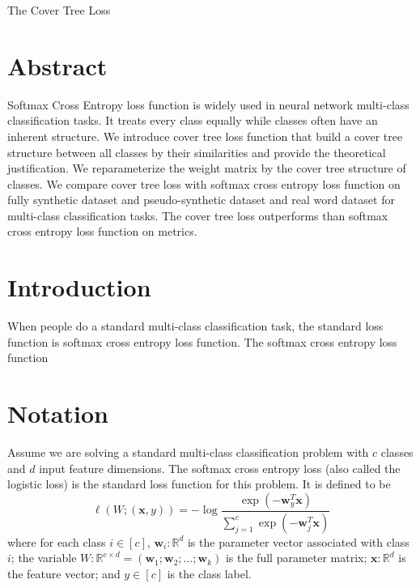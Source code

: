 \documentclass[10pt]{article}
\theoremstyle{definition}
\newcommand{\R}{\mathbb R}
\newcommand{\trans}[1]{{#1}^{T}}
\newcommand{\w}{\mathbf w}
\newcommand{\x}{\mathbf x}
\begin{document}
\begin{center}
\Huge
The Cover Tree Loss
\end{center}

\section{Abstract}
Softmax Cross Entropy loss function is widely used in neural network multi-class classification tasks. 
It treats every class equally while classes often have an inherent structure. We introduce cover tree loss function that build a cover tree structure between all classes by their similarities and provide the theoretical justification. 
We reparameterize the weight matrix by the cover tree structure of classes.
We compare cover tree loss with softmax cross entropy loss function on fully synthetic dataset and pseudo-synthetic dataset and real word dataset for multi-class classification tasks. 
The cover tree loss outperforms than softmax cross entropy loss function on metrics.  

\section{Introduction}
When people do a standard multi-class classification task, the standard loss function is softmax cross entropy loss function.
The softmax cross entropy loss function 

\section{Notation}

Assume we are solving a standard multi-class classification problem with $c$ classes and $d$ input feature dimensions.
The softmax cross entropy loss (also called the logistic loss) is the standard loss function for this problem.
It is defined to be
\begin{equation}
    \label{eq:xentropy}
    \ell(W;(\x,y)) = - \log \frac {\exp(-\trans\w_y \x)}{\sum_{j=1}^c \exp(-\trans \w_j \x)}
\end{equation}
where for each class $i\in[c]$,
$\w_i : \R^d$ is the parameter vector associated with class $i$;
the variable $W : \R^{c \times d} = (\w_1; \w_2; ...; \w_k)$ is the full parameter matrix;
$\x : \R^d$ is the feature vector;
and $y \in [c]$ is the class label.
\end{document}
